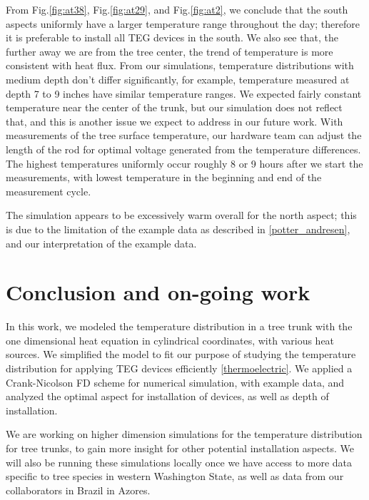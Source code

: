 \documentclass{IEEEtran} %
\begin{document}
From Fig.\ref{fig:at38}, Fig.\ref{fig:at29}, and Fig.\ref{fig:at2}, we conclude that the south aspects uniformly have a larger temperature range throughout the day; therefore it is preferable to install all TEG devices in the south. We also see that, the further away we are from the tree center, the trend of temperature is more consistent with heat flux. From our simulations, temperature distributions with medium depth don't differ significantly, for example, temperature measured at depth 7 to 9 inches have similar temperature ranges. We expected fairly constant temperature near the center of the trunk, but our simulation does not reflect that, and this is another issue we expect to address in our future work.
With measurements of the tree surface temperature, our hardware team can adjust the length of the rod for optimal voltage generated from the temperature differences. The highest temperatures uniformly occur roughly 8 or 9 hours after we start the measurements, with lowest temperature in the beginning and end of the measurement cycle. 

The simulation appears to be excessively warm overall for the north aspect; this is due to the limitation of the example data as described in \ref{potter_andresen}, and our interpretation of the example data. %

\section{Conclusion and on-going work}
In this work, we modeled the temperature distribution in a tree trunk with the one dimensional heat equation in cylindrical coordinates, with various heat sources. We simplified the model to fit our purpose of studying the temperature distribution for applying TEG devices efficiently \ref{thermoelectric}. We applied a Crank-Nicolson FD scheme for numerical simulation, with example data, and analyzed the optimal aspect for installation of devices, as well as depth of installation. 

We are working on higher dimension simulations for the temperature distribution for tree trunks, to gain more insight for other potential installation aspects. We will also be running these simulations locally once we have access to more data specific to tree species in western Washington State, as well as data from our collaborators in Brazil in Azores.
\end{document}
